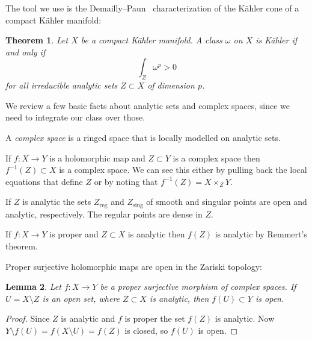 \documentclass[11pt]{amsart}
\newtheorem{theo}{Theorem}
\newtheorem{lemm}[theo]{Lemma}
\theoremstyle{definition}
\begin{document}
The tool we use is the Demailly--Paun~\cite{demailly2004numerical} characterization of the K\"ahler cone of a compact K\"ahler manifold:


\begin{theo}
Let $X$ be a compact K\"ahler manifold.
A class $\omega$ on $X$ is K\"ahler if and only if
\[
\int_Z \omega^p > 0
\]
for all irreducible analytic sets $Z \subset X$ of dimension $p$.
\end{theo}


We review a few basic facts about analytic sets and complex spaces, since we need to integrate our class over those.


A \emph{complex space} is a ringed space that is locally modelled on analytic sets.

If $f : X \to Y$ is a holomorphic map and $Z \subset Y$ is a complex space then $f^{-1}(Z) \subset X$ is a complex space.
We can see this either by pulling back the local equations that define $Z$ or by noting that $f^{-1}(Z) = X \times_Z Y$.

If $Z$ is analytic the sets $Z_{\text{reg}}$ and $Z_{\text{sing}}$ of smooth and singular points are open and analytic, respectively.
The regular points are dense in $Z$.

If $f : X \to Y$ is proper and $Z \subset X$ is analytic then $f(Z)$ is analytic by Remmert's theorem.

Proper surjective holomorphic maps are open in the Zariski topology:

\begin{lemm}
Let $f : X \to Y$ be a proper surjective morphism of complex spaces.
If $U = X \setminus Z$ is an open set, where $Z \subset X$ is analytic, then $f(U) \subset Y$ is open.
\end{lemm}

\begin{proof}
Since $Z$ is analytic and $f$ is proper the set $f(Z)$ is analytic.
Now
\(
Y \setminus f(U)
= f(X \setminus U)
= f(Z)
\)
is closed, so $f(U)$ is open.
\end{proof}
\end{document}
